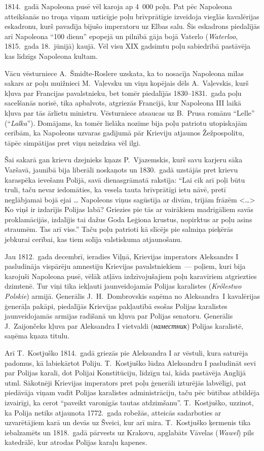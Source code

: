 \documentclass[twoside,a5paper,12pt,fleqn,openany]{extbook}
\newcommand{\pltxti}[1]{\textit{\textpolish{#1}}}
\newcommand{\rutxti}[1]{\textit{\textrussian{#1}}}
\newcommand{\entxti}[1]{\textit{\textenglish{#1}}}
\newcommand{\citespace}{<\dots{}>}
\begin{document}
1814.~gadā Napoleona pusē vēl karoja ap 4~000 poļu. Pat pēc Napoleona atteikšanās no troņa viņam uzticīgie poļu brīvprātīgie izveidoja vieglās kavalērijas eskadronu, kurš pavadīja bijušo imperatoru uz Elbas salu. Šis eskadrons piedalījās arī Napoleona ``100 dienu'' epopejā un pilnībā gāja bojā Vaterlo (\entxti{Waterloo}, 1815.~gada 18.~jūnijā) kaujā. Vēl visu XIX gadsimtu poļu sabiedrībā pastāvēja kas līdzīgs Napoleona kultam.

Vācu vēsturniece A.~Šmidte-Roslere uzskata, ka to nosacīja Napoleona mīlas sakars ar poļu muižnieci M.~Vaļevsku un viņu kopējais dēls A.~Vaļevskis, kurš kļuva par Francijas pavalstnieku, bet tomēr piedalījās 1830--1831.~gada poļu sacelšanās norisē, tika apbalvots, atgriezās Francijā, kur Napoleona III laikā kļuva par tās ārlietu ministru. Vēsturniece atsaucas uz B.~Prusa romānu ``Lelle'' (``\pltxti{Lalka}''). Domājams, ka tomēr lielāka nozīme bija poļu patriotu utopiskajām cerībām, ka Napoleons uzvaras gadījumā pār Krieviju atjaunos Žežpospolitu, tāpēc simpātijas pret viņu neizdzisa vēl ilgi.

Šai sakarā gan krievu dzejnieks kņazs P.~Vjazemskis, kurš savu karjeru sāka Varšavā, jaunībā bija liberāli noskaņots un 1830.~gadā uzstājās pret krievu karaspēka ievešanu Polijā, savā dienasgrāmatā rakstīja: ``Lai cik arī poļi būtu truli, taču nevar iedomāties, ka vesela tauta brīvprātīgi ietu nāvē, pretī neglābjamai bojā ejai \dots{} Napoleons viņus sagūstīja ar divām, trijām frāzēm \citespace{} Ko viņš ir izdarījis Polijas labā? Griezies pie tās ar vairākiem madrigāliem savās proklamācijās, izdalījis tai dažus Goda Leģiona krustus, nopirktus ar poļu asins straumēm. Tas arī viss.'' Taču poļu patrioti kā slīcējs pie salmiņa pieķērās jebkurai cerībai, kas tiem solīja valstiskuma atjaunošanu.

Jau 1812.~gada decembrī, ieradies Viļņā, Krievijas imperators Aleksandrs I pasludināja vispārēju amnestiju Krievijas pavalstniekiem~--- poļiem, kuri bija karojuši Napoleona pusē, vēlāk atļāva izdzīvojušajiem poļu karavīriem atgriezties dzimtenē. Tur viņi tika iekļauti jaunveidojamās Polijas karalistes (\pltxti{Królestwo Polskie}) armijā. Ģenerālis J.~H.~Dombrovskis saņēma no Aleksandra~I kavalērijas ģenerāļa pakāpi, piedalījās Krievijas pakļautībā esošas Polijas karalistes jaunveidojamās armijas radīšanā un kļuva par Polijas senatoru. Ģenerālis J.~Zaijončeks kļuva par Aleksandra I vietvaldi (\rutxti{наместник}) Polijas karalistē, saņēma kņaza titulu.

Arī T.~Kostjuško 1814.~gadā griezās pie Aleksandra I ar vēstuli, kura saturēja padomus, kā labiekārtot Poliju. T.~Kostjuško lūdza Aleksandru I pasludināt sevi par Polijas karali, dot Polijai Konstitūciju, līdzīgu tai, kāda pastāvēja Anglijā utml. Sākotnēji Krievijas imperators pret poļu ģenerāli izturējās labvēlīgi, pat piedāvāja viņam vadīt Polijas karalistes administrāciju, taču pēc būtības atbildēja izvairīgi, ka cerot ``paveikt varonīgās tautas atdzimšanu''. T.~Kostjuško, uzzinot, ka Polija netiks atjaunota 1772.~gada robežās, atteicās sadarboties ar uzvarētājiem karā un devās uz Šveici, kur arī mira. T.~Kostjuško ķermenis tika iebalzamēts un 1818.~gadā pārvests uz Krakovu, apglabāts Vāvelas (\pltxti{Wawel}) pils katedrālē, kur atrodas Polijas karaļu kapenes.
\end{document}
